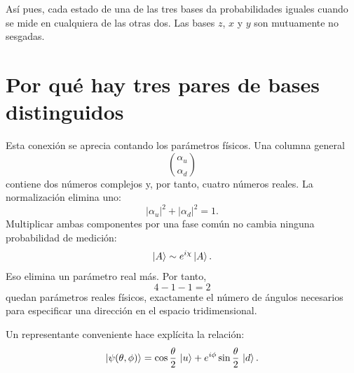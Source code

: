 Así pues, cada estado de una de las tres bases da probabilidades iguales cuando se mide en cualquiera de las otras dos. Las bases \(z\), \(x\) y \(y\) son mutuamente no sesgadas.

\section{Por qué hay tres pares de bases distinguidos}

\begin{classroomqa}
\end{classroomqa}

Esta conexión se aprecia contando los parámetros físicos. Una columna general
\[
\binom{\alpha_u}{\alpha_d}
\]
contiene dos números complejos y, por tanto, cuatro números reales. La normalización elimina uno:
\[
|\alpha_u|^2+|\alpha_d|^2=1.
\]
Multiplicar ambas componentes por una fase común no cambia ninguna probabilidad de medición:
\begin{equation}
\left\lvert A\right\rangle\sim e^{i\chi}\left\lvert A\right\rangle.
\label{eq:global-phase}
\end{equation}
Eso elimina un parámetro real más. Por tanto,
\begin{equation}
4-1-1=2
\end{equation}
quedan parámetros reales físicos, exactamente el número de ángulos necesarios para especificar una dirección en el espacio tridimensional.

Un representante conveniente hace explícita la relación:
\begin{equation}
\left\lvert\psi(\theta,\phi)\right\rangle
=\cos\frac{\theta}{2}\,\left\lvert u\right\rangle
+e^{i\phi}\sin\frac{\theta}{2}\,\left\lvert d\right\rangle.
\label{eq:bloch-parameterization}
\end{equation}

